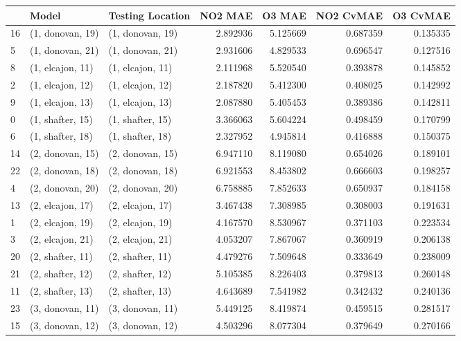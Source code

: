 \begin{tabular}{lllrrrr}
\toprule
{} &             Model &  Testing Location &   NO2 MAE &    O3 MAE &  NO2 CvMAE &  O3 CvMAE \\
\midrule
16 &  (1, donovan, 19) &  (1, donovan, 19) &  2.892936 &  5.125669 &   0.687359 &  0.135335 \\
5  &  (1, donovan, 21) &  (1, donovan, 21) &  2.931606 &  4.829533 &   0.696547 &  0.127516 \\
8  &  (1, elcajon, 11) &  (1, elcajon, 11) &  2.111968 &  5.520540 &   0.393878 &  0.145852 \\
2  &  (1, elcajon, 12) &  (1, elcajon, 12) &  2.187820 &  5.412300 &   0.408025 &  0.142992 \\
9  &  (1, elcajon, 13) &  (1, elcajon, 13) &  2.087880 &  5.405453 &   0.389386 &  0.142811 \\
0  &  (1, shafter, 15) &  (1, shafter, 15) &  3.366063 &  5.604224 &   0.498459 &  0.170799 \\
6  &  (1, shafter, 18) &  (1, shafter, 18) &  2.327952 &  4.945814 &   0.416888 &  0.150375 \\
14 &  (2, donovan, 15) &  (2, donovan, 15) &  6.947110 &  8.119080 &   0.654026 &  0.189101 \\
22 &  (2, donovan, 18) &  (2, donovan, 18) &  6.921553 &  8.453802 &   0.666603 &  0.198257 \\
4  &  (2, donovan, 20) &  (2, donovan, 20) &  6.758885 &  7.852633 &   0.650937 &  0.184158 \\
13 &  (2, elcajon, 17) &  (2, elcajon, 17) &  3.467438 &  7.308985 &   0.308003 &  0.191631 \\
1  &  (2, elcajon, 19) &  (2, elcajon, 19) &  4.167570 &  8.530967 &   0.371103 &  0.223534 \\
3  &  (2, elcajon, 21) &  (2, elcajon, 21) &  4.053207 &  7.867067 &   0.360919 &  0.206138 \\
20 &  (2, shafter, 11) &  (2, shafter, 11) &  4.479276 &  7.509648 &   0.333649 &  0.238009 \\
21 &  (2, shafter, 12) &  (2, shafter, 12) &  5.105385 &  8.226403 &   0.379813 &  0.260148 \\
11 &  (2, shafter, 13) &  (2, shafter, 13) &  4.643689 &  7.541982 &   0.342432 &  0.240136 \\
23 &  (3, donovan, 11) &  (3, donovan, 11) &  5.449125 &  8.419874 &   0.459515 &  0.281517 \\
15 &  (3, donovan, 12) &  (3, donovan, 12) &  4.503296 &  8.077304 &   0.379649 &  0.270166 \\

\end{tabular}
